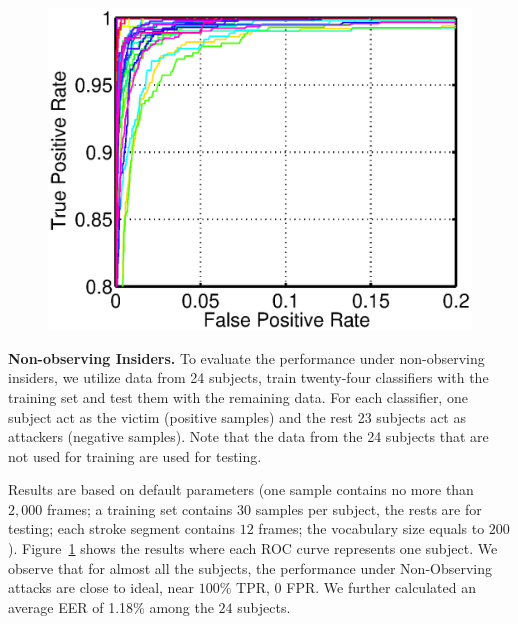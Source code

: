 \begin{figure}[!b]
\centering
\vspace{-6mm}
{\includegraphics[width=.8\columnwidth]{./Graphic/roc/fig_11_24random.eps}}
\vspace{-3mm}
\caption{\vspace{-1mm}}\label{fig:random}
\vspace{-1mm}
\end{figure}

 


\textbf{Non-observing Insiders.} 
To evaluate the performance under non-observing insiders, 
we utilize data from 24 subjects, train twenty-four classifiers with the training set and test them with the remaining data. For each classifier, one subject act as the victim (positive samples) and the rest 23 subjects act as attackers (negative  samples). Note that the data from the 24 subjects that are not used for training are used for testing.


 Results are based on default parameters (one sample contains no more than $2,000$ frames; a training set contains $30$ samples per subject, the rests are for testing; each stroke segment contains $12$ frames; the vocabulary size equals to $200$). Figure~\ref{fig:random} shows the results where each ROC curve represents one subject. We observe that for almost all the subjects, the performance under Non-Observing attacks are close to ideal, near $100\%$ TPR, 0 FPR.   We further calculated an average EER of 1.18\% among the $24$ subjects.

